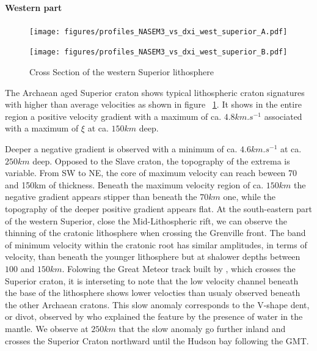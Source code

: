 \documentclass[12pt]{article}
\begin{document}
	\paragraph{Western part}
		\begin{figure}
			\begin{minipage}{0.5\linewidth}
				\centerline{\texttt{[image: figures/profiles\_NASEM3\_vs\_dxi\_west\_superior\_A.pdf]}}
			\end{minipage}
			\hfill
			\begin{minipage}{0.5\linewidth}
				\centerline{\texttt{[image: figures/profiles\_NASEM3\_vs\_dxi\_west\_superior\_B.pdf]}}
			\end{minipage}

			\caption{Cross Section of the western Superior lithosphere}
			\label{westsupcross}

		\end{figure}

		The Archaean aged Superior craton shows typical lithospheric craton signatures with higher than average velocities as shown in figure ~\ref{westsupcross}. 
		It shows in the entire region a positive velocity gradient with a maximum of ca. $4.8km.s^{-1}$  associated with a maximum of $\xi$ at ca. $150km$ deep.

		Deeper a negative gradient is observed with a minimum of ca. $4.6km.s^{-1}$ at ca. $250km$ deep. 
		Opposed to the Slave craton, the topography of the extrema is variable. 
		From SW to NE, the core of maximum velocity can reach beween 70 and 150km of thickness. 
		Beneath the maximum velocity region of ca. $150km$ the negative gradient appears stipper than beneath the $70km$ one, while the topography of the deeper positive gradient appears flat. 
		At the south-eastern part of the western Superior, close the Mid-Lithospheric rift, we can observe the thinning of the cratonic lithosphere when crossing the Grenville front. 
		The band of minimum velocity within the cratonic root has similar amplitudes, in terms of velocity, than beneath the younger lithosphere but at shalower depths between $100$ and $150km$. 
		Folowing the Great Meteor track built by \cite{heaman2000timing}, which crosses the Superior craton, it is interseting to note that the low velocity channel beneath the base of the lithosphere shows lower velocties than usualy observed beneath the other Archaean cratons. 
		This slow anomaly corresponds to the V-shape dent, or divot, observed by \cite{lee1997upper} who explained the feature by the presence of water in the mantle. 
		We observe at $250km$ that the slow anomaly go further inland and crosses the Superior Craton northward until the Hudson bay following the GMT.
\end{document}
